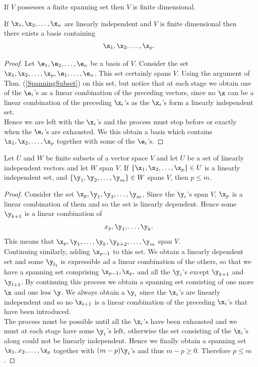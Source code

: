 \begin{corollary}
If $V$ possesses a finite spanning set then $V$ is finite dimensional. 
\end{corollary}

\begin{theorem}
If $\x_1, \x_2, \hdots, \x_n$ are linearly independent and $V$ is finite dimensional then there exists a basis containing
\[ \x_1, \x_2, \hdots, \x_p.\]
\end{theorem}
\begin{proof}
Let $\e_1, \e_2, \hdots, \e_n$ be a basis of $V$. Consider the set $\x_1, \x_2, \hdots, \x_p, \e_1, \hdots, \e_n$. This set certainly spans $V$. Using the argument of Thm. (\ref{SpanningSubset}) on this set, but notice that 
at each stage we obtain one of the $\e_i$'s as a linear combination of the preceding vectors, since no $\x$ can be a linear combination of the preceding $\x_i$'s as the $\x_i$'s form a linearly independent set. \\

Hence we are left with the $\x_i$'s and the process must stop before or exactly when the $\e_i$'s are exhausted. We this obtain a basis which contains $\x_1, \x_2, \hdots, \x_p$ together with some of the $\e_i$'s. 
\end{proof}

\begin{theorem}
Let $U$ and $W$ be finite subsets of a vector space $V$ and let $U$ be a set of linearly independent vectors and let $W$ span $V$. 
If $\{\x_1, \x_2, \hdots, \x_p\} \in U$ is a linearly independent set, and $\{\y_1, \y_2, \hdots, \y_m\} \in W$ spans $V$, then $p\le m$. \label{TH2_1}
\end{theorem}

\begin{proof}
Consider the set $\x_p, \y_1, \y_2, \hdots, \y_m$, Since the $\y_i$'s span $V$, $\x_p$ is a linear combination of them and so the set is linearly dependent. Hence some $\y_{k+1}$ is a linear combination of 
\[ x_p, \y_1, \hdots, \y_k.\] This means that $\x_p, \y_1, \hdots, \y_k, \y_{k+2}, \hdots, \y_m$ span $V$. \\

Continuing similarly, adding $\x_{p-1}$ to this set. We obtain a linearly dependent set and some $\y_{l_1}$ is expressible ad a linear combination of the others, so that we have a spanning set comprising
$\x_{p-1}, \x_p,$ and all the $\y_i$'s except $\y_{k+1}$ and $\y_{l + 1}$. By continuing this process we obtain a spanning set consisting of one more $\x$ and one less $\y$. We always obtain a $\y_i$ since the $\x_i$'s are 
linearly independent and so no $\x_{i+1}$ is a linear combination of the preceding $\x_i$'s that have been introduced. \\

The process must be possible until all the $\x_i$'s have been exhausted and we must at each stage have some $\y_i$'s left, otherwise the set consisting of the $\x_i$'s along could not be linearly independent. 
Hence we finally obtain a spanning set $\x_1, x_2, \hdots, \x_p$ together with $(m-p)\y_i$'s and thus $m-p \ge 0$. Therefore $p\le m$. 
\end{proof}

